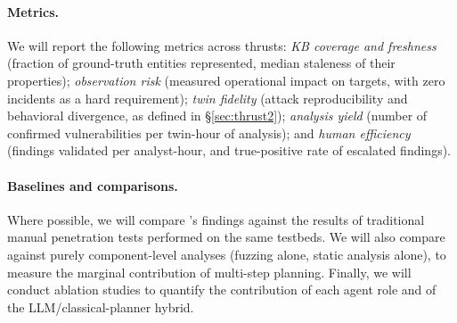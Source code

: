 \paragraph{Metrics.}
We will report the following metrics across thrusts:
\emph{KB coverage and freshness} (fraction of ground-truth entities
represented, median staleness of their properties);
\emph{observation risk} (measured operational impact on targets, with
zero incidents as a hard requirement);
\emph{twin fidelity} (attack reproducibility and behavioral divergence,
as defined in \S\ref{sec:thrust2});
\emph{analysis yield} (number of confirmed vulnerabilities per
twin-hour of analysis); and
\emph{human efficiency} (findings validated per analyst-hour, and
true-positive rate of escalated findings).

\paragraph{Baselines and comparisons.}
Where possible, we will compare \sysname's findings against the
results of traditional manual penetration tests performed on the same
testbeds. We will also compare against purely component-level
analyses (fuzzing alone, static analysis alone), to measure the
marginal contribution of multi-step planning. Finally, we will
conduct ablation studies to quantify the contribution of each agent
role and of the LLM/classical-planner hybrid.
